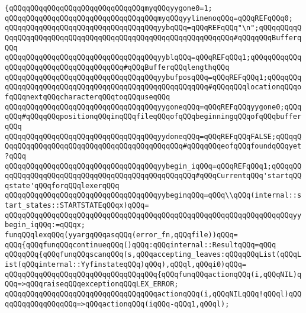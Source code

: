 \verb|{qQQqqQQqqQQqqQQqqQQqqQQqqQQqqQQqmyqQQqyygone0=1;|\newline
\verb|qQQqqQQqqQQqqQQqqQQqqQQqqQQqqQQqqQQqmyqQQqyylinenoqQQq=qQQqREFqQQq0;|\newline
\newline
\verb|qQQqqQQqqQQqqQQqqQQqqQQqqQQqqQQqqQQqyybqQQq=qQQqREFqQQq"\n";qQQqqQQqqQQqqQQqqQQqqQQqqQQqqQQqqQQqqQQqqQQqqQQqqQQqqQQqqQQqqQQq#qQQqqQQqBufferqQQq|\newline
\verb|qQQqqQQqqQQqqQQqqQQqqQQqqQQqqQQqqQQqyyblqQQq=qQQqREFqQQq1;qQQqqQQqqQQqqQQqqQQqqQQqqQQqqQQqqQQqqQQq#qQQqBufferqQQqlengthqQQq|\newline
\verb|qQQqqQQqqQQqqQQqqQQqqQQqqQQqqQQqqQQqyybufposqQQq=qQQqREFqQQq1;qQQqqQQqqQQqqQQqqQQqqQQqqQQqqQQqqQQqqQQqqQQqqQQqqQQqqQQq#qQQqqQQqlocationqQQqofqQQqnextqQQqcharacterqQQqtoqQQquseqQQq|\newline
\verb|qQQqqQQqqQQqqQQqqQQqqQQqqQQqqQQqqQQqyygoneqQQq=qQQqREFqQQqyygone0;qQQqqQQq#qQQqqQQqpositionqQQqinqQQqfileqQQqofqQQqbeginningqQQqofqQQqbufferqQQq|\newline
\verb|qQQqqQQqqQQqqQQqqQQqqQQqqQQqqQQqqQQqyydoneqQQq=qQQqREFqQQqFALSE;qQQqqQQqqQQqqQQqqQQqqQQqqQQqqQQqqQQqqQQqqQQqqQQq#qQQqqQQqeofqQQqfoundqQQqyet?qQQq|\newline
\verb|qQQqqQQqqQQqqQQqqQQqqQQqqQQqqQQqqQQqyybegin_iqQQq=qQQqREFqQQq1;qQQqqQQqqQQqqQQqqQQqqQQqqQQqqQQqqQQqqQQqqQQqqQQqqQQq#qQQqCurrentqQQq'startqQQqstate'qQQqforqQQqlexerqQQq|\newline
\newline
\verb|qQQqqQQqqQQqqQQqqQQqqQQqqQQqqQQqqQQqyybeginqQQq=qQQq\\qQQq(internal::start_states::STARTSTATEqQQqx)qQQq=|\newline
\verb|qQQqqQQqqQQqqQQqqQQqqQQqqQQqqQQqqQQqqQQqqQQqqQQqqQQqqQQqqQQqqQQqqQQqyybegin_iqQQq:=qQQqx;|\newline
\newline
\verb|funqQQqlexqQQq(yyargqQQqasqQQq(error_fn,qQQqfile))qQQq=|\newline
\verb|qQQq{qQQqfunqQQqcontinueqQQq()qQQq:qQQqinternal::ResultqQQq=qQQq|\newline
\verb|qQQqqQQq{qQQqfunqQQqscanqQQq(s,qQQqaccepting_leaves:qQQqqQQqList(qQQqList(qQQqinternal::YyfinstateqQQq)qQQq),qQQql,qQQqi0)qQQq=|\newline
\verb|qQQqqQQqqQQqqQQqqQQqqQQqqQQqqQQqqQQq{qQQqfunqQQqactionqQQq(i,qQQqNIL)qQQq=>qQQqraiseqQQqexceptionqQQqLEX_ERROR;|\newline
\verb|qQQqqQQqqQQqqQQqqQQqqQQqqQQqqQQqqQQqactionqQQq(i,qQQqNILqQQq!qQQql)qQQqqQQqqQQqqQQqqQQq=>qQQqactionqQQq(iqQQq-qQQq1,qQQql);|\newline
